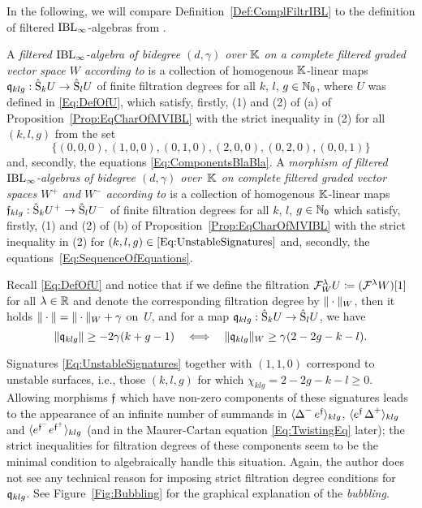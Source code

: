 \documentclass[\MainFolder/Text.tex]{subfiles}
\begin{document}
In the following, we will compare Definition~\ref{Def:ComplFiltrIBL} to the definition of filtered $\mathrm{IBL}_\infty$-algebras from \cite[Section~8]{Cieliebak2015}.

A \emph{filtered $\mathrm{IBL}_\infty$-algebra of bidegree $(d,\gamma)$ over $\mathbb{K}$ on a complete filtered graded vector space $W$ according to \cite{Cieliebak2015}} is a collection of homogenous $\mathbb{K}$-linear maps $\mathfrak{q}_{klg}:\hat{\mathrm{S}}_k U\rightarrow\hat{\mathrm{S}}_l U$ of finite filtration degrees for all $k$, $l$, $g\in \mathbb{N}_0$, where $U$ was defined in \eqref{Eq:DefOfU}, which satisfy, firstly, (1) and (2) of (a) of Proposition~\ref{Prop:EqCharOfMVIBL} with the strict inequality in (2) for all $(k,l,g)$ from the set 
\begin{equation}\label{Eq:UnstableSignatures}
\bigl\{(0,0,0), (1,0,0), (0,1,0), (2,0,0), (0,2,0), (0,0,1)\bigr\}
\end{equation}
and, secondly, the equations \eqref{Eq:ComponentsBlaBla}. A \emph{morphism of filtered $\mathrm{IBL}_\infty$-algebras of bidegree $(d,\gamma)$ over~$\mathbb{K}$ on complete filtered graded vector spaces $W^+$ and $W^-$ according to \cite{Cieliebak2015}} 
is a collection of homogenous $\mathbb{K}$-linear maps $\mathfrak{f}_{klg}: \hat{\mathrm{S}}_k U^+ \rightarrow \hat{\mathrm{S}}_l U^-$ of finite filtration degrees for all $k$, $l$, $g\in \mathbb{N}_0$ which satisfy, firstly, (1) and (2) of (b) of Proposition~\ref{Prop:EqCharOfMVIBL} with the strict inequality in (2) for $(k,l,g)\in\eqref{Eq:UnstableSignatures}$ and, secondly, the equations~\eqref{Eq:SequenceOfEquations}.

Recall \eqref{Eq:DefOfU} and notice that if we define the filtration $\mathcal{F}_W^\lambda U \coloneqq (\mathcal{F}^\lambda W)[1]$ for all $\lambda\in \mathbb{R}$ and denote the corresponding filtration degree by $\| \cdot \|_W$, then it holds $\| \cdot \| = \| \cdot \|_W + \gamma$ on~$U$, and for a map $\mathfrak{q}_{klg}:\hat{\mathrm{S}}_k U\rightarrow\hat{\mathrm{S}}_l U$, we have
\[ \| \mathfrak{q}_{klg} \|\ge -2\gamma(k+g-1)\quad\Longleftrightarrow\quad\| \mathfrak{q}_{klg} \|_W \ge \gamma(2-2g-k-l). \]

Signatures \eqref{Eq:UnstableSignatures} together with $(1,1,0)$ correspond to unstable surfaces, i.e., those $(k,l,g)$ for which $\chi_{klg}=2-2g-k-l \ge 0$. Allowing morphisms $\mathfrak{f}$ which have non-zero components of these signatures leads to the appearance of an infinite number of summands in $\langle \operatorname{\Delta}^- e^{\mathfrak{f}} \rangle_{klg}$, $\langle e^{\mathfrak{f}}\operatorname{\Delta}^+\rangle_{klg}$ and $\langle e^{\mathfrak{f}^-}e^{\mathfrak{f}^+}\rangle_{klg}$ (and in the Maurer-Cartan equation \eqref{Eq:TwistingEq} later); the strict inequalities for filtration degrees of these components seem to be the minimal condition to algebraically handle this situation. Again, the author does not see any technical reason for imposing strict filtration degree conditions for~$\mathfrak{q}_{klg}$. See Figure~\ref{Fig:Bubbling} for the graphical explanation of the \emph{bubbling}.
\end{document}
